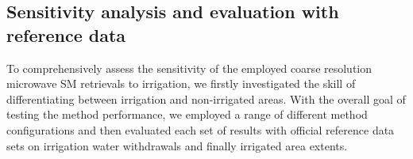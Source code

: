 \documentclass[hess, manuscript]{copernicus}
\begin{document}
\subsection{Sensitivity analysis and evaluation with reference data}
\label{ssec:sensitivity-analysis}
To comprehensively assess the sensitivity of the employed coarse resolution microwave SM retrievals to irrigation, we firstly investigated the skill of differentiating between irrigation and non-irrigated areas. With the overall goal of testing the method performance, we employed a range of different method configurations and then evaluated each set of results with official reference data sets on irrigation water withdrawals and finally irrigated area extents.

\end{document}

